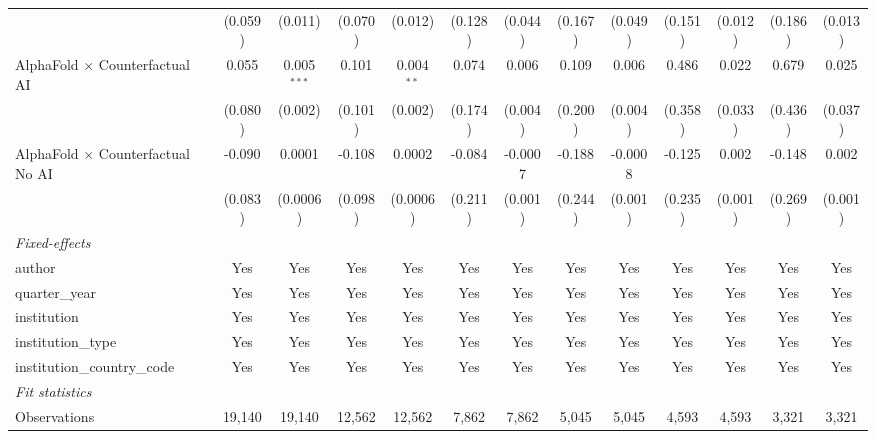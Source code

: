 \begin{tabular}{lcccccccccccc}
                                            & (0.059) & (0.011)       & (0.070) & (0.012)       & (0.128) & (0.044) & (0.167) & (0.049) & (0.151)       & (0.012)       & (0.186) & (0.013)\\   
   AlphaFold $\times$ Counterfactual AI     & 0.055   & 0.005$^{***}$ & 0.101   & 0.004$^{**}$  & 0.074   & 0.006   & 0.109   & 0.006   & 0.486         & 0.022         & 0.679   & 0.025\\   
                                            & (0.080) & (0.002)       & (0.101) & (0.002)       & (0.174) & (0.004) & (0.200) & (0.004) & (0.358)       & (0.033)       & (0.436) & (0.037)\\   
   AlphaFold $\times$ Counterfactual No AI  & -0.090  & 0.0001        & -0.108  & 0.0002        & -0.084  & -0.0007 & -0.188  & -0.0008 & -0.125        & 0.002         & -0.148  & 0.002\\   
                                            & (0.083) & (0.0006)      & (0.098) & (0.0006)      & (0.211) & (0.001) & (0.244) & (0.001) & (0.235)       & (0.001)       & (0.269) & (0.001)\\   
   \midrule
   \emph{Fixed-effects}\\
   author                                   & Yes     & Yes           & Yes     & Yes           & Yes     & Yes     & Yes     & Yes     & Yes           & Yes           & Yes     & Yes\\  
   quarter\_year                            & Yes     & Yes           & Yes     & Yes           & Yes     & Yes     & Yes     & Yes     & Yes           & Yes           & Yes     & Yes\\  
   institution                              & Yes     & Yes           & Yes     & Yes           & Yes     & Yes     & Yes     & Yes     & Yes           & Yes           & Yes     & Yes\\  
   institution\_type                        & Yes     & Yes           & Yes     & Yes           & Yes     & Yes     & Yes     & Yes     & Yes           & Yes           & Yes     & Yes\\  
   institution\_country\_code               & Yes     & Yes           & Yes     & Yes           & Yes     & Yes     & Yes     & Yes     & Yes           & Yes           & Yes     & Yes\\  
   \midrule
   \emph{Fit statistics}\\
   Observations                             & 19,140  & 19,140        & 12,562  & 12,562        & 7,862   & 7,862   & 5,045   & 5,045   & 4,593         & 4,593         & 3,321   & 3,321\\  

\end{tabular}
